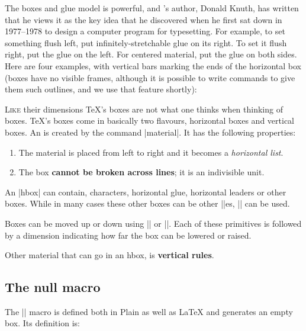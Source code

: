 The boxes and glue model is powerful, and \tex's author, Donald Knuth,
has written that he views it as the key idea that he discovered when he
first sat down in 1977--1978 to design a computer program for typesetting.
For example, to set something flush left, put infinitely-stretchable glue on
its right. To set it flush right, put the glue on the left. For centered material,
put the glue on both sides. Here are four examples, with vertical
bars marking the ends of the horizontal box (boxes have no visible frames,
although it is possible to write \tex commands to give them such outlines,
and we use that feature shortly):






\medskip



\noindent \lettrine{L}{ike} their dimensions \TeX's boxes are not what one thinks when thinking of boxes. TeX's boxes come in basically two flavours, horizontal boxes and vertical boxes. An  is created by the command |\hbox{material}|. It has the following properties:

\begin{enumerate}
\item The material is placed from left to right and it becomes a \textit{horizontal list}.
\item The box \textbf{cannot be broken across lines}; it is an indivisible unit.
\end{enumerate}

An |hbox| can contain, characters, horizontal glue, horizontal leaders or other boxes. While in many cases these other boxes can be other |\hbox|es, |\vbox| can be used.

Boxes can be moved up or down using |\raise| or |\lower|. Each of these primitives is followed by a dimension indicating how far the box can be lowered or raised.

Other material that can go in an hbox, is \textbf{vertical rules}. 

\subsection{The null macro}

The |\null| macro is defined both in Plain as well as LaTeX and generates an empty box. Its definition is:

\begin{teXXX}
\def\null{\hbox{}}
\end{teXXX}


